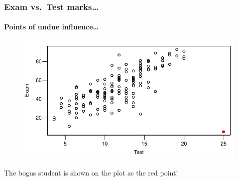 \documentclass{beamer}\usepackage[]{graphicx}\usepackage[]{xcolor}
\begin{document}
\begin{frame}[fragile]
\frametitle{Exam vs.\ Test marks\ldots}
\framesubtitle{Points of undue influence\ldots}


\begin{figure}
  \centering
  \includegraphics{figure/RC-H02-017}
\end{figure}

The bogus student is shown on the plot as the {\color{red}red} point!

\end{frame}
\end{document}

